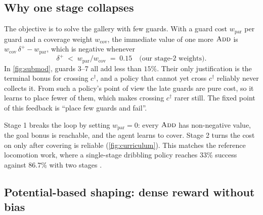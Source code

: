 \documentclass[11pt,a4paper]{article}
\begin{document}
\subsection{Why one stage collapses}\label{sec:collapse}

The objective is to solve the gallery with few guards. With a guard cost $w_{\mathrm{par}}$
per guard and a coverage weight $w_{\mathrm{cov}}$, the immediate value of one more $\textsc{Add}$ is
$w_{\mathrm{cov}}\,\delta^+ - w_{\mathrm{par}}$, which is negative whenever
\[
  \delta^+ \;<\; w_{\mathrm{par}}/w_{\mathrm{cov}} \;=\; 0.15 \quad\text{(our stage-2 weights).}
\]
In \cref{fig:submod}, guards 3--7 all add less than $15\%$. Their only justification is the
terminal bonus for crossing $c^\dagger$, and a policy that cannot yet cross $c^\dagger$
reliably never collects it. From such a policy's point of view the late guards are pure
cost, so it learns to place fewer of them, which makes crossing $c^\dagger$ rarer still. The
fixed point of this feedback is ``place few guards and fail''.

Stage 1 breaks the loop by setting $w_{\mathrm{par}}=0$: every $\textsc{Add}$ has non-negative value,
the goal bonus is reachable, and the agent learns to cover. Stage 2 turns the cost on only
after covering is reliable (\cref{fig:curriculum}). This matches the reference locomotion
work, where a single-stage dribbling policy reaches $33\%$ success against $86.7\%$ with two
stages \cite{wang2025dribble}.

\subsection{Potential-based shaping: dense reward without bias}\label{sec:shaping}
\end{document}

